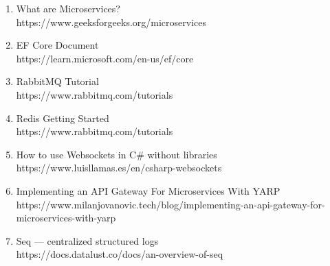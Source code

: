 \documentclass[../index.tex]{subfiles}
\begin{document}
    \begin{enumerate}
        \item What are Microservices?
        \\ https://www.geeksforgeeks.org/microservices
        \item EF Core Document
        \\ https://learn.microsoft.com/en-us/ef/core
        \item RabbitMQ Tutorial
        \\ https://www.rabbitmq.com/tutorials
        \item Redis Getting Started
        \\ https://www.rabbitmq.com/tutorials
        \item How to use Websockets in C\# without libraries
        \\ https://www.luisllamas.es/en/csharp-websockets
        \item Implementing an API Gateway For Microservices With YARP
        \\ https://www.milanjovanovic.tech/blog/implementing-an-api-gateway-for-microservices-with-yarp
        \item Seq — centralized structured logs
        \\ https://docs.datalust.co/docs/an-overview-of-seq
    \end{enumerate}
\end{document}
